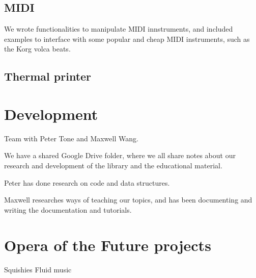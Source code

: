 \subsection{MIDI}

We wrote functionalities to manipulate MIDI innstruments, and included examples to interface with some popular and cheap MIDI instruments, such as the Korg volca beats.


\subsection{Thermal printer}



\section{Development}

Team with Peter Tone and Maxwell Wang.

We have a shared Google Drive folder, where we all share notes about our research and development of the library and the educational material.

Peter has done research on code and data structures.

Maxwell researches ways of teaching our topics, and has been documenting and writing the documentation and tutorials.

\section{Opera of the Future projects}

Squishies
Fluid music
